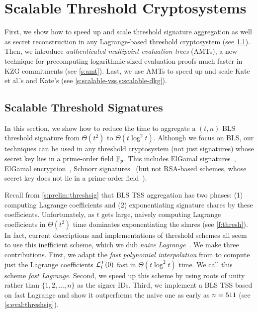 \section{Scalable Threshold Cryptosystems}
First, we show how to speed up and scale threshold signature aggregation as well as secret reconstruction in any Lagrange-based threshold cryptosystem (see \cref{s:threshsig}).
Then, we introduce \textit{authenticated multipoint evaluation trees} (AMTs), a new technique for precomputing logarithmic-sized evaluation proofs much faster in KZG commitments (see \cref{s:amt}).
Last, we use AMTs to speed up and scale Kate et al.'s \evss and Kate's \ejfdkg (see \cref{s:scalable-vss,s:scalable-dkg}).

\subsection{Scalable Threshold Signatures}
\label{s:threshsig}
In this section, we show how to reduce the time to aggregate a $(t,n)$ BLS threshold signature from $\Theta(t^2)$ to $\Theta(t\log^2{t})$.
Although we focus on BLS, our techniques can be used in any threshold cryptosystem (not just signatures) whose secret key lies in a prime-order field $\mathbb{F}_p$.
This includes ElGamal signatures~\cite{Harn1994GroupOriented,Park96NewElGamal,Gennaro1996Robust}, ElGamal encryption~\cite{DesmedtFrankel1990Threshold}, Schnorr signatures~\cite{threshold-schnorr,Gennaro2003SecureApplications} (but not RSA-based schemes, whose secret key does not lie in a prime-order field~\cite{Shoup2000Practical}).

Recall from \cref{s:prelim:threshsig} that BLS TSS aggregation has two phases: (1) computing Lagrange coefficients and (2) exponentiating signature shares by these coefficients.
Unfortunately, as $t$ gets large, naively computing Lagrange coefficients in $\Theta(t^2)$ time dominates exponentiating the shares (see \cref{f:thresh}).
In fact, current descriptions and implementations of threshold schemes all seem to use this inefficient scheme, which we dub \textit{naive Lagrange}~\cite{bls-chia-impl,bls-dfinity-impl,bls-herumi-impl,bls-sbft-impl,Boldyreva2003Threshold}.
We make three contributions.
First, we adapt the \textit{fast polynomial interpolation} from \cite{moderncomputeralgebra-ch10} to compute just the Lagrange coefficients $\mathcal{L}_i^T(0)$ fast in $\Theta(t\log^2{t})$ time.
We call this scheme \textit{fast Lagrange}.
Second, we speed up this scheme by using roots of unity rather than $\{1,2,\dots, n\}$ as the signer IDs.
Third, we implement a BLS TSS based on fast Lagrange and show it outperforms the naive one as early as $n=511$ (see \cref{s:eval:threshsig}).

